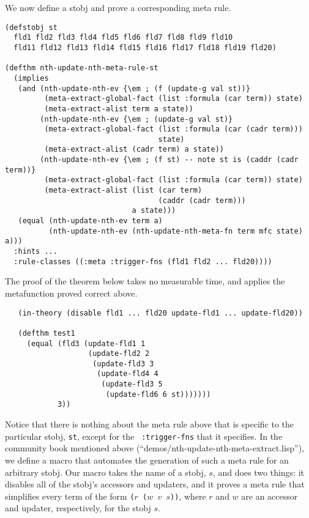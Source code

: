 \noindent We now define a stobj and prove a corresponding meta rule.

\begin{Verbatim}[commandchars=\\\{\},fontsize=\small]
(defstobj st
  fld1 fld2 fld3 fld4 fld5 fld6 fld7 fld8 fld9 fld10
  fld11 fld12 fld13 fld14 fld15 fld16 fld17 fld18 fld19 fld20)

(defthm nth-update-nth-meta-rule-st
  (implies
   (and (nth-update-nth-ev {\em ; (f (update-g val st))}
         (meta-extract-global-fact (list :formula (car term)) state)
         (meta-extract-alist term a state))
        (nth-update-nth-ev {\em ; (update-g val st)}
         (meta-extract-global-fact (list :formula (car (cadr term)))
                                   state)
         (meta-extract-alist (cadr term) a state))
        (nth-update-nth-ev {\em ; (f st) -- note st is (caddr (cadr term))}
         (meta-extract-global-fact (list :formula (car term)) state)
         (meta-extract-alist (list (car term)
                                   (caddr (cadr term)))
                             a state)))
   (equal (nth-update-nth-ev term a)
          (nth-update-nth-ev (nth-update-nth-meta-fn term mfc state) a)))
  :hints ...
  :rule-classes ((:meta :trigger-fns (fld1 fld2 ... fld20))))
\end{Verbatim}

\noindent The proof of the theorem below takes no measurable time, and
applies the metafunction proved correct above.

\begin{verbatim}
   (in-theory (disable fld1 ... fld20 update-fld1 ... update-fld20))

   (defthm test1
     (equal (fld3 (update-fld1 1
                   (update-fld2 2
                    (update-fld3 3
                     (update-fld4 4
                      (update-fld3 5
                       (update-fld6 6 st)))))))
            3))
\end{verbatim}

Notice that there is nothing about the meta rule above that is
specific to the particular stobj, {\tt st}, except for the {\tt
  :trigger-fns} that it specifies.  In the community book mentioned
above (``demos/nth-\allowbreak{}update-\allowbreak{}nth-\allowbreak{}meta-\allowbreak{}extract.lisp''), we define a macro
that automates the generation of such a meta rule for an
arbitrary stobj.  Our macro takes the name of a stobj, $s$, and does two
things: it disables all of the stobj's accessors and updaters, and it
proves a meta rule that simplifies every term of the form {\tt ($r$
  ($w$ $v$ $s$))}, where $r$ and $w$ are an accessor and updater,
respectively, for the stobj $s$.

